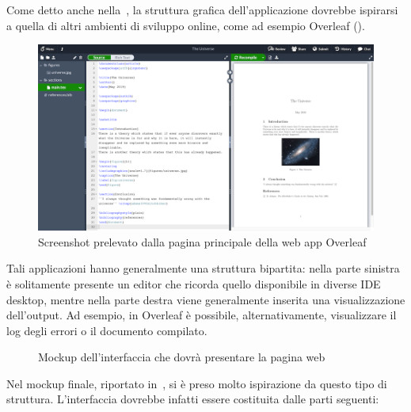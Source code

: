       Come detto anche nella~, la struttura grafica dell'applicazione dovrebbe ispirarsi a quella di altri ambienti di sviluppo online,
      come ad esempio Overleaf ().

      \begin{figure}[htbp]
        \centering
        \includegraphics[width=.85\textwidth]{res/fig/overleaf.png}%
        \caption{Screenshot prelevato dalla pagina principale della web app Overleaf}%
        \label{fig:overleaf}
      \end{figure}

      Tali applicazioni hanno generalmente una struttura bipartita:
      nella parte sinistra è solitamente presente un editor che ricorda quello disponibile in diverse IDE desktop, mentre nella parte destra viene generalmente inserita una visualizzazione dell'output.
      Ad esempio, in Overleaf è possibile, alternativamente, visualizzare il log degli errori o il documento compilato.

      \begin{figure}[htbp]
        \centering
        \caption{Mockup dell'interfaccia che dovrà presentare la pagina web}%
        \label{fig:mockup}
      \end{figure}

      Nel mockup finale, riportato in~, si è preso molto ispirazione da questo tipo di struttura.
      L'interfaccia dovrebbe infatti essere costituita dalle parti seguenti:

